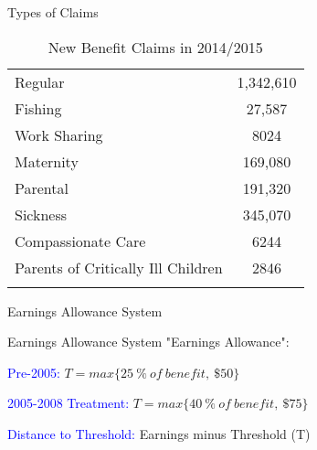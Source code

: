 \documentclass{beamer}
\newenvironment{widelist}{\itemize\addtolength{\itemsep}{16pt}}{\enditemize}
\begin{document}
\begin{frame}{Types of Claims}
\begin{table}\centering \caption{New Benefit Claims in 2014/2015}
	\begin{tabular}{lc}
		\toprule
		Regular &	1,342,610  \\ \addlinespace
		Fishing &	27,587\\ \addlinespace
		Work Sharing&	8024\\ \addlinespace
		Maternity&	169,080\\ \addlinespace
		Parental &	191,320\\ \addlinespace
		Sickness &	345,070\\ \addlinespace
		Compassionate Care &	6244\\ \addlinespace
		Parents of Critically Ill Children&	2846\\ \addlinespace
		\bottomrule
	\end{tabular}
\end{table}
\end{frame}


\begin{frame}{Earnings Allowance System}
\end{frame}


\begin{frame}{Earnings Allowance System}
"Earnings Allowance":
\bigskip
\begin{widelist}
	\item \textcolor{blue}{Pre-2005:}  $T  = max\{ 25 \ \% \ of \ benefit, \ \$50 \}$ 
	\item \textcolor{blue}{2005-2008 Treatment:}  $T = max\{ 40 \ \% \ of \ benefit, \ \$75 \}$\
	\item \textcolor{blue}{Distance to Threshold:} Earnings minus Threshold (T)
\end{widelist}
\end{frame}
\end{document}
